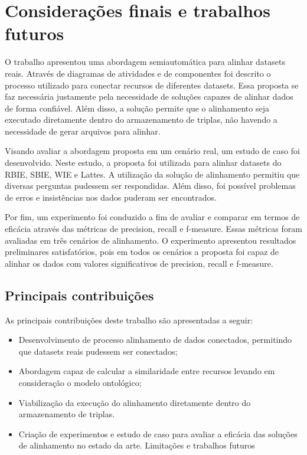 \chapter{Considerações finais e trabalhos futuros}

O trabalho apresentou uma abordagem semiautomática para alinhar datasets reais. Através de diagramas de atividades e de componentes foi descrito o processo utilizado para conectar recursos de diferentes datasets. Essa proposta se faz necessária justamente pela necessidade de soluções capazes de alinhar dados de forma confiável. Além disso, a solução permite que o alinhamento seja executado diretamente dentro do armazenamento de triplas, não havendo a necessidade de gerar arquivos para alinhar. 

Visando avaliar a abordagem proposta em um cenário real, um estudo de caso foi desenvolvido. Neste estudo, a proposta foi utilizada para alinhar datasets do RBIE, SBIE, WIE e Lattes. A utilização da solução de alinhamento permitiu que diversas perguntas pudessem ser respondidas. Além disso, foi possível problemas de erros e insistências nos dados puderam ser encontrados.

Por fim, um experimento foi conduzido  a fim de avaliar e comparar em termos de eficácia através das métricas de precision, recall e f-measure. Essas métricas foram avaliadas em três cenários de alinhamento. O experimento apresentou resultados preliminares satisfatórios, pois em todos os cenários a proposta foi capaz de alinhar os dados com valores significativos de precision, recall e f-measure.

\section*{Principais contribuições}
As principais contribuições deste trabalho são apresentadas a seguir:
\begin{itemize}
\item Desenvolvimento de processo alinhamento de dados conectados, permitindo que datasets reais pudessem ser conectados;
\item Abordagem capaz de calcular a similaridade entre recursos levando em consideração o modelo ontológico;
\item Viabilização da execução do alinhamento diretamente dentro do armazenamento de triplas.
\item  Criação de experimentos e estudo de caso para avaliar a eficácia das soluções de alinhamento no estado da arte.
Limitações e trabalhos futuros
\end{itemize}


